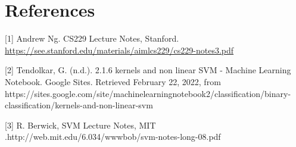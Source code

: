 \documentclass[11pt]{article}
\begin{document}
\section*{References}
[1] Andrew Ng. CS229 Lecture Notes, Stanford. \url{https://see.stanford.edu/materials/aimlcs229/cs229-notes3.pdf}

[2] Tendolkar, G. (n.d.). 2.1.6 kernels and non linear SVM - Machine Learning Notebook. Google Sites. Retrieved February 22, 2022, from https://sites.google.com/site/machinelearningnotebook2/classification/binary-classification/kernels-and-non-linear-svm 

[3] R. Berwick, SVM Lecture Notes, MIT .http://web.mit.edu/6.034/wwwbob/svm-notes-long-08.pdf

{


}


\end{document}
